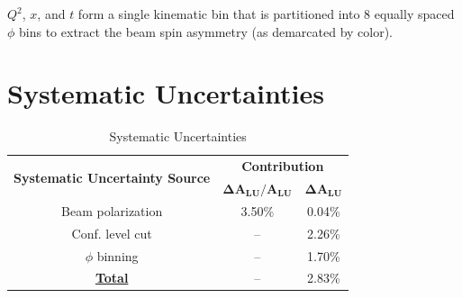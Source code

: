 \documentclass[10pt,prd,aps,showpacs,twocolumn,unsortedaddress]{revtex4-1}
\renewcommand\b[1]{{\textbf{#1}}}
\renewcommand\u[1]{{\underline{#1}}}
\begin{document}
$Q^2$, $x$, and $t$ form a single kinematic bin that is partitioned into 8 equally spaced $\phi$ bins to extract the beam spin asymmetry (as demarcated by color).

\section{Systematic Uncertainties \label{systematics}}
      \begin{table}[h!]
        \centering
        \caption{Systematic Uncertainties}
        \label{tab:sys_uncerts}
        \begin{tabular}{|c|c|c|}
          \hline
        \multirow{2}{*}{ \b{Systematic Uncertainty Source }}        &\multicolumn{2}{c|}{\b{Contribution}}
             \\\cline{2-3} &$\bm{\Delta A_{LU}/A_{LU}}$  & $\bm{\Delta A_{LU}}$%
          \\
          \hline                                                  
          Beam polarization                   & 3.50\%            & 0.04\%         
          \\                                                      
          Conf. level cut                     & --                & 2.26\%         
          \\                                                      
          $\phi$ binning                      & --                & 1.70\%         
          \\                                                      
          \hline                                                  
          \b{\u{Total}}                       & --                & 2.83\%         
          \\
          \hline
        \end{tabular}
      \end{table}
\end{document}
